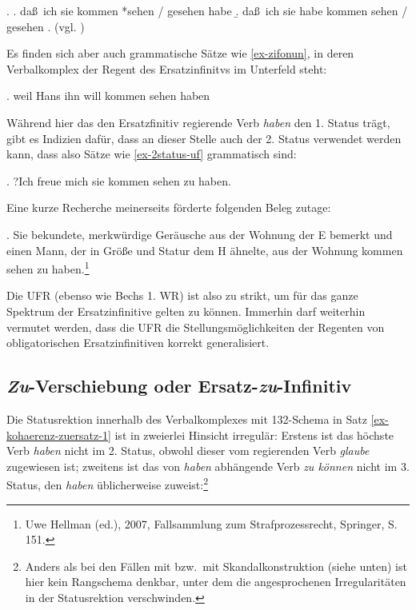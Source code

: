\ex. \label{ex-bech-5}
\a. da\ss\ ich sie kommen *sehen / gesehen habe
\b. da\ss\ ich sie habe kommen sehen / gesehen
\z. (vgl. \citealt[\S 20]{Bech:63}) 

Es finden sich aber auch grammatische Sätze wie \ref{ex-zifonun}, in deren Verbalkomplex der Regent des Ersatzinfinitvs im Unterfeld steht:

\ex. \label{ex-zifonun}weil Hans ihn will kommen sehen haben \hfill 
\citep[1286]{Zifonun:etal:97}

Während hier das den Ersatzfinitiv regierende Verb {\it haben} den 1. Status trägt, gibt es Indizien dafür, dass an dieser Stelle auch der 2. Status verwendet werden kann, dass also Sätze wie \ref{ex-2status-uf} grammatisch sind:

\ex. ?Ich freue mich sie kommen sehen zu haben. \label{ex-2status-uf}

Eine kurze Recherche meinerseits förderte folgenden Beleg zutage:

\ex. Sie bekundete, merkwürdige Geräusche aus der Wohnung der E bemerkt und einen Mann, der in Grö\ss e und Statur dem H ähnelte, aus der Wohnung kommen sehen zu haben.\footnote{Uwe Hellman (ed.), 2007, Fallsammlung zum Strafprozessrecht, Springer, S.\,151.}\label{ex-2status-uf-corpus}

Die UFR (ebenso wie Bechs 1. WR) ist also zu strikt, um für das ganze Spektrum der Ersatzinfinitive gelten zu können. Immerhin darf weiterhin vermutet werden, dass die UFR die Stellungsmöglichkeiten der Regenten von obligatorischen Ersatzinfinitiven korrekt generalisiert. 



\subsection{\emph{Zu}-Verschiebung oder Ersatz-\emph{zu}-Infinitiv}

%
Die Statusrektion innerhalb des Verbalkomplexes mit 132-Schema in Satz \ref{ex-kohaerenz-zuersatz-1} ist in zweierlei Hinsicht irregulär: Erstens ist das höchste Verb {\it haben} nicht im 2. Status, obwohl dieser vom regierenden Verb {\it glaube} zugewiesen ist; zweitens ist das von {\it haben} abhängende Verb {\it zu können} nicht im 3. Status, den {\it haben} üblicherweise zuweist:\footnote{Anders als bei den Fällen mit  bzw.\ mit Skandalkonstruktion (siehe unten) ist hier kein Rangschema denkbar, unter dem die angesprochenen Irregularitäten in der Statusrektion verschwinden.}

